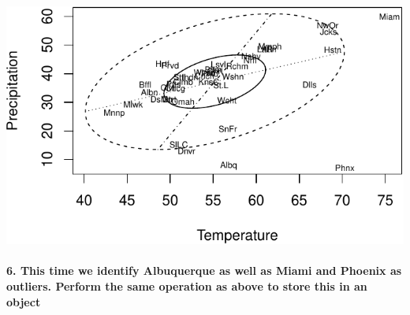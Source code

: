 \documentclass[
]{article}
\newenvironment{Shaded}{\begin{snugshade}}{\end{snugshade}}
\newcommand{\DataTypeTok}[1]{\textcolor[rgb]{0.13,0.29,0.53}{#1}}
\newcommand{\FloatTok}[1]{\textcolor[rgb]{0.00,0.00,0.81}{#1}}
\newcommand{\KeywordTok}[1]{\textcolor[rgb]{0.13,0.29,0.53}{\textbf{#1}}}
\newcommand{\NormalTok}[1]{#1}
\newcommand{\OperatorTok}[1]{\textcolor[rgb]{0.81,0.36,0.00}{\textbf{#1}}}
\newcommand{\StringTok}[1]{\textcolor[rgb]{0.31,0.60,0.02}{#1}}
\begin{document}
\begin{Shaded}
\end{Shaded}

\begin{center}\includegraphics{2.0-Multivariate-Visualization-Assignment_files/figure-latex/unnamed-chunk-7-1} \end{center}

\hypertarget{this-time-we-identify-albuquerque-as-well-as-miami-and-phoenix-as-outliers.-perform-the-same-operation-as-above-to-store-this-in-an-object}{%
\paragraph{\texorpdfstring{\textbf{6. This time we identify Albuquerque
as well as Miami and Phoenix as outliers. Perform the same operation as
above to store this in an
object}}{6. This time we identify Albuquerque as well as Miami and Phoenix as outliers. Perform the same operation as above to store this in an object}}\label{this-time-we-identify-albuquerque-as-well-as-miami-and-phoenix-as-outliers.-perform-the-same-operation-as-above-to-store-this-in-an-object}}
\end{document}
